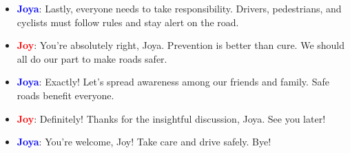\documentclass{article}
\begin{document}
\begin{itemize}
    \item \textbf{\textcolor{blue}{Joya}}: Lastly, everyone needs to take responsibility. Drivers, pedestrians, and cyclists must follow rules and stay alert on the road.
    \item \textbf{\textcolor{red}{Joy}}: You’re absolutely right, Joya. Prevention is better than cure. We should all do our part to make roads safer.
    \item \textbf{\textcolor{blue}{Joya}}: Exactly! Let’s spread awareness among our friends and family. Safe roads benefit everyone.
    \item \textbf{\textcolor{red}{Joy}}: Definitely! Thanks for the insightful discussion, Joya. See you later!
    \item \textbf{\textcolor{blue}{Joya}}: You’re welcome, Joy! Take care and drive safely. Bye!
\end{itemize}
\end{document}
